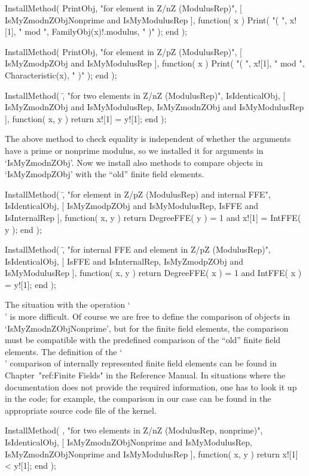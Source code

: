 \begintt
InstallMethod( PrintObj,
    "for element in Z/nZ (ModulusRep)",
    [ IsMyZmodnZObjNonprime and IsMyModulusRep ],
    function( x )
    Print( "( ", x![1], " mod ", FamilyObj(x)!.modulus, " )" );
    end );

InstallMethod( PrintObj,
    "for element in Z/pZ (ModulusRep)",
    [ IsMyZmodpZObj and IsMyModulusRep ],
    function( x )
    Print( "( ", x![1], " mod ", Characteristic(x), " )" );
    end );

InstallMethod( \=,
    "for two elements in Z/nZ (ModulusRep)",
    IsIdenticalObj,
    [ IsMyZmodnZObj and IsMyModulusRep,
      IsMyZmodnZObj and IsMyModulusRep ],
    function( x, y ) return x![1] = y![1]; end );
\endtt

The above method to check equality is independent of whether the
arguments have a prime or nonprime modulus,
so we installed it for arguments in `IsMyZmodnZObj'.
Now we install also methods to compare objects in `IsMyZmodpZObj'
with the ``old'' finite field elements.

\begintt
InstallMethod( \=,
    "for element in Z/pZ (ModulusRep) and internal FFE",
    IsIdenticalObj,
    [ IsMyZmodpZObj and IsMyModulusRep, IsFFE and IsInternalRep ],
    function( x, y )
    return DegreeFFE( y ) = 1 and x![1] = IntFFE( y );
    end );

InstallMethod( \=,
    "for internal FFE and element in Z/pZ (ModulusRep)",
    IsIdenticalObj,
    [ IsFFE and IsInternalRep, IsMyZmodpZObj and IsMyModulusRep ],
    function( x, y )
    return DegreeFFE( x ) = 1 and IntFFE( x ) = y![1];
    end );
\endtt

The situation with the operation `\\\<' is more difficult.
Of course we are free to define the comparison of objects in
`IsMyZmodnZObjNonprime',
but for the finite field elements, the comparison must be compatible
with the predefined comparison of the ``old'' finite field elements.
The definition of the `\\\<' comparison of internally represented
finite field elements can be found in Chapter~"ref:Finite Fields"
in the Reference Manual.
In situations where the documentation does not provide the required
information, one has to look it up in the {\GAP} code;
for example, the comparison in our case can be found in the
appropriate source code file of the {\GAP} kernel.

\begintt
InstallMethod( \<,
    "for two elements in Z/nZ (ModulusRep, nonprime)",
    IsIdenticalObj,
    [ IsMyZmodnZObjNonprime and IsMyModulusRep,
      IsMyZmodnZObjNonprime and IsMyModulusRep ],
    function( x, y ) return x![1] < y![1]; end );

